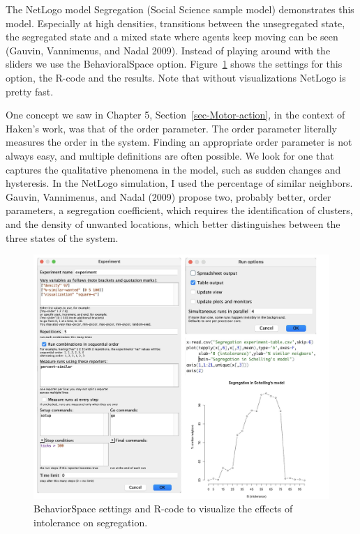\documentclass[
  a4paper,
  DIV=11,
  numbers=noendperiod,
  oneside]{scrreprt}
\begin{document}
The NetLogo model Segregation (Social Science sample model) demonstrates
this model. Especially at high densities, transitions between the
unsegregated state, the segregated state and a mixed state where agents
keep moving can be seen (Gauvin, Vannimenus, and Nadal 2009). Instead of
playing around with the sliders we use the BehavioralSpace option.
Figure~\ref{fig-ch7-img1-old-89} shows the settings for this option, the
R-code and the results. Note that without visualizations NetLogo is
pretty fast.

One concept we saw in Chapter 5, Section~\ref{sec-Motor-action}, in the
context of Haken's work, was that of the order parameter. The order
parameter literally measures the order in the system. Finding an
appropriate order parameter is not always easy, and multiple definitions
are often possible. We look for one that captures the qualitative
phenomena in the model, such as sudden changes and hysteresis. In the
NetLogo simulation, I used the percentage of similar neighbors. Gauvin,
Vannimenus, and Nadal (2009) propose two, probably better, order
parameters, a segregation coefficient, which requires the identification
of clusters, and the density of unwanted locations, which better
distinguishes between the three states of the system.

\begin{figure}

{\centering \includegraphics{media/ch7/image1.jpg}

}

\caption{\label{fig-ch7-img1-old-89}BehaviorSpace settings and R-code to
visualize the effects of intolerance on segregation.}

\end{figure}
\end{document}
